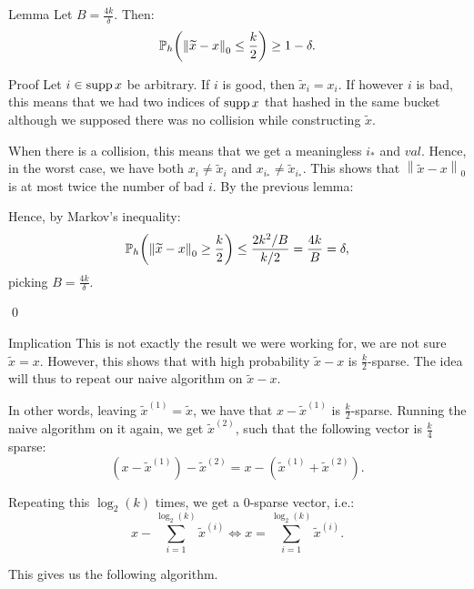 \documentclass[a4paper]{article}
\begin{document}
\begin{parag}{Lemma}
    Let $B = \frac{4k}{\delta}$. Then: 
    \[\prob_h\left(\left\|\widetilde{x} - x\right\|_0 \leq \frac{k}{2}\right) \geq 1 - \delta.\]

    \begin{subparag}{Proof}
        Let $i \in \operatorname{supp} x$ be arbitrary. If $i$ is good, then $\widetilde{x}_i = x_i$. If however $i$ is bad, this means that we had two indices of $\operatorname{supp} x$ that hashed in the same bucket although we supposed there was no collision while constructing $\widetilde{x}$. 

        When there is a collision, this means that we get a meaningless $i_*$ and $val$. Hence, in the worst case, we have both $x_i \neq \widetilde{x}_i$ and $x_{i_*} \neq \widetilde{x}_{i_*}$. This shows that $\left\|\widetilde{x} - x\right\|_0$ is at most twice the number of bad $i$. By the previous lemma: 

        Hence, by Markov's inequality: 
        \[\prob_h\left(\left\|\widetilde{x} - x\right\|_0 \geq \frac{k}{2}\right) \leq \frac{2k^2/B}{k/2} = \frac{4k}{B} = \delta,\]
        picking $B = \frac{4k}{\delta}$.

        \qed
    \end{subparag}
    
    \begin{subparag}{Implication}
        This is not exactly the result we were working for, we are not sure $\widetilde{x} = x$. However, this shows that with high probability $\widetilde{x} - x$ is $\frac{k}{2}$-sparse. The idea will thus to repeat our naive algorithm on $\widetilde{x} - x$.

        In other words, leaving $\widetilde{x}^{\left(1\right)} = \widetilde{x}$, we have that $x - \widetilde{x}^{\left(1\right)}$ is $\frac{k}{2}$-sparse. Running the naive algorithm on it again, we get $\widetilde{x}^{\left(2\right)}$, such that the following vector is $\frac{k}{4}$ sparse:
        \[\left(x - \widetilde{x}^{\left(1\right)}\right) - \widetilde{x}^{\left(2\right)} = x - \left(\widetilde{x}^{\left(1\right)} + \widetilde{x}^{\left(2\right)}\right).\]

        Repeating this $\log_2\left(k\right)$ times, we get a $0$-sparse vector, i.e.: 
        \[x - \sum_{i=1}^{\log_2\left(k\right)} \widetilde{x}^{\left(i\right)} \iff x = \sum_{i=1}^{\log_2\left(k\right)} \widetilde{x}^{\left(i\right)}.\]
        
        This gives us the following algorithm.
    \end{subparag}
\end{parag}
\end{document}
